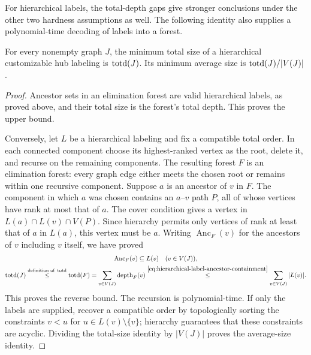 For hierarchical labels, the total-depth gaps give stronger conclusions
under the other two hardness assumptions as well. The following identity
also supplies a polynomial-time decoding of labels into a forest.
\begin{lemma}
\label{lem:hierarchical-label-total-depth}
For every nonempty graph $J$, the minimum total size of a hierarchical
customizable hub labeling is $\operatorname{totd}(J)$. Its minimum average size is
$\operatorname{totd}(J)/|V(J)|$.
\end{lemma}
\begin{proof}
Ancestor sets in an elimination forest are valid hierarchical labels,
as proved above, and their total size is the forest's total depth.
This proves the upper bound.

Conversely, let $L$ be a hierarchical labeling and fix a compatible
total order. In each connected component choose its highest-ranked
vertex as the root, delete it, and recurse on the remaining components.
The resulting forest $F$ is an elimination forest: every graph edge
either meets the chosen root or remains within one recursive component.
Suppose $a$ is an ancestor of $v$ in $F$. The component in which $a$
was chosen contains an $a$--$v$ path $P$, all of whose vertices have
rank at most that of $a$. The cover condition gives a vertex in
$L(a)\cap L(v)\cap V(P)$. Since hierarchy permits only vertices of
rank at least that of $a$ in $L(a)$, this vertex must be $a$.
Writing $\operatorname{Anc}_F(v)$ for the ancestors of $v$ including
$v$ itself, we have proved
\begin{equation}\label{eq:hierarchical-label-ancestor-containment}
\begin{gathered}
 \operatorname{Anc}_F(v)\subseteq L(v)\quad(v\in V(J)),\\
 \operatorname{totd}(J)\overset{\text{definition of }\operatorname{totd}}{\leq}\operatorname{totd}(F)
 =\sum_{v\in V(J)}\operatorname{depth}_F(v)
 \overset{\eqref{eq:hierarchical-label-ancestor-containment}}{\leq}
 \sum_{v\in V(J)}|L(v)|.
\end{gathered}
\end{equation}
This proves the reverse bound. The recursion is polynomial-time.
If only the labels are supplied, recover a compatible order by
topologically sorting the constraints $v<u$ for
$u\in L(v)\setminus\{v\}$; hierarchy guarantees that these constraints
are acyclic. Dividing the total-size identity by $|V(J)|$ proves the
average-size identity.
\end{proof}


